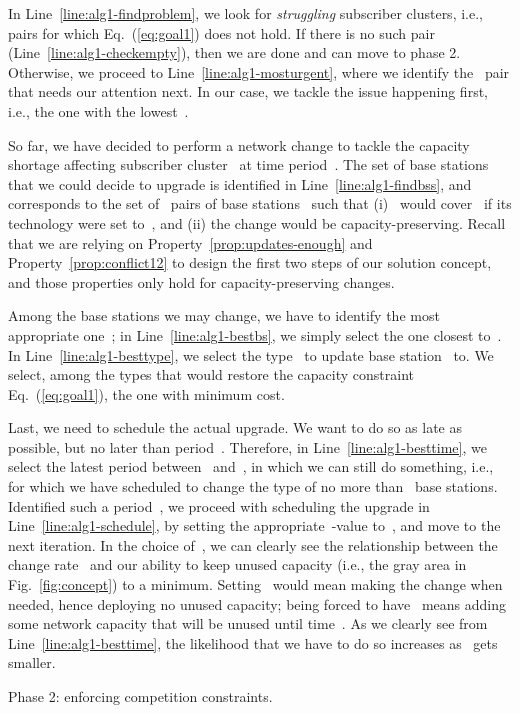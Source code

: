 \documentclass[10pt,journal,cspaper,compsoc]{IEEEtran}
\newcommand{\Fig}[1]{Fig.~\ref{fig:#1}}
\newcommand{\Eq}[1]{Eq.~(\ref{eq:#1})}
\newcommand{\Line}[1]{Line~\ref{line:#1}}
\newcommand{\Prop}[1]{Property~\ref{prop:#1}}
\begin{document}
In \Line{alg1-findproblem}, we look for {\em struggling} subscriber clusters, i.e.,~ pairs
for which \Eq{goal1} does not hold. If there is no such pair
(\Line{alg1-checkempty}), then we are done and can move to phase 2. Otherwise, we proceed to \Line{alg1-mosturgent}, where we
identify the~ pair that needs our attention next. In our case, we tackle the issue happening first, i.e., the one
with the lowest~.

So far, we have decided to perform a network change to tackle the capacity shortage affecting subscriber cluster~
at time period~. The set of base stations that we could decide to upgrade is identified in \Line{alg1-findbss},
and corresponds to the set of~ pairs of base stations~ such that
(i)~ would cover~ if its technology were set to~, and (ii) the change would be capacity-preserving.
Recall that we are relying on \Prop{updates-enough} and \Prop{conflict12} to design the first two steps of our solution concept,
and those properties only hold for capacity-preserving changes.

Among the base stations we may change, we have to identify the most appropriate one~; in
\Line{alg1-bestbs}, we simply select the one closest to~.
In \Line{alg1-besttype}, we select the type~ to update base station~ to. We select, among the types that
would restore the capacity constraint \Eq{goal1}, the one with minimum cost.

Last, we need to schedule the actual upgrade. We want to do so as late as possible, but no later than period~.
Therefore, in \Line{alg1-besttime}, we select the latest period between~ and~, in which we can still do something, i.e.,
for which we have scheduled to change the type of no more than~ base stations. Identified such a period~, we proceed with
scheduling the upgrade in \Line{alg1-schedule},
by setting the appropriate~-value to~, and move to the next iteration.
In the choice of~,
we can clearly see the relationship between the change rate~ and our ability to keep unused capacity (i.e., the gray area
in \Fig{concept}) to a minimum. Setting~ would mean making the change when needed, hence deploying no unused capacity;
being forced to have~ means adding some network capacity that will be unused until time~.
As we clearly see from \Line{alg1-besttime}, the likelihood that we have to do so increases as~ gets smaller.

\begin{algorithm}[t]
\begin{algorithmic}[1]
\Require 
{}
	\State  \label{line:alg2-sim}
	\State  \label{line:alg2-findproblem}
	\If{} \label{line:alg2-checkempty}
	\EndIf
	\State  \label{line:alg2-mosturgent}
	\State  \label{line:alg2-findbss}
	\State  \label{line:alg2-bestbs}
	\State  \label{line:alg2-besttype}
	\State  \label{line:alg2-besttime}
	\State  \label{line:alg2-schedule}
\EndWhile
\Return 
\end{algorithmic}
\caption{Phase 2: enforcing competition constraints.
  \label{alg:competition}}
\end{algorithm}
\end{document}
